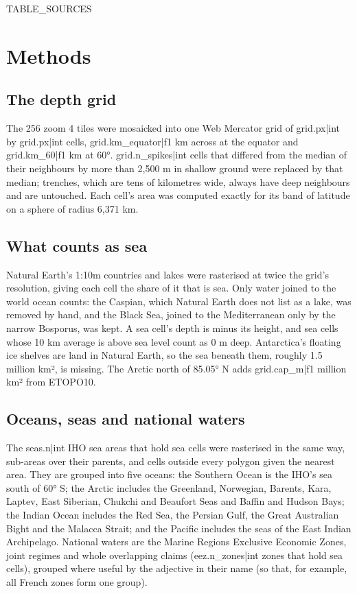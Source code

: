 \documentclass[11pt,a4paper]{article}
\begin{document}
{{TABLE_SOURCES}}

\section{Methods}
\subsection{The depth grid}
The 256 zoom 4 tiles were mosaicked into one Web Mercator grid of {{grid.px|int}} by {{grid.px|int}} cells, {{grid.km_equator|f1}} km across at the equator and {{grid.km_60|f1}} km at 60°. {{grid.n_spikes|int}} cells that differed from the median of their neighbours by more than 2,500 m in shallow ground were replaced by that median; trenches, which are tens of kilometres wide, always have deep neighbours and are untouched. Each cell's area was computed exactly for its band of latitude on a sphere of radius 6,371 km.

\subsection{What counts as sea}
Natural Earth's 1:10m countries and lakes were rasterised at twice the grid's resolution, giving each cell the share of it that is sea. Only water joined to the world ocean counts: the Caspian, which Natural Earth does not list as a lake, was removed by hand, and the Black Sea, joined to the Mediterranean only by the narrow Bosporus, was kept. A sea cell's depth is minus its height, and sea cells whose 10 km average is above sea level count as 0 m deep. Antarctica's floating ice shelves are land in Natural Earth, so the sea beneath them, roughly 1.5 million km², is missing. The Arctic north of 85.05° N adds {{grid.cap_m|f1}} million km² from ETOPO10.

\subsection{Oceans, seas and national waters}
The {{seas.n|int}} IHO sea areas that hold sea cells were rasterised in the same way, sub-areas over their parents, and cells outside every polygon given the nearest area. They are grouped into five oceans: the Southern Ocean is the IHO's sea south of 60° S; the Arctic includes the Greenland, Norwegian, Barents, Kara, Laptev, East Siberian, Chukchi and Beaufort Seas and Baffin and Hudson Bays; the Indian Ocean includes the Red Sea, the Persian Gulf, the Great Australian Bight and the Malacca Strait; and the Pacific includes the seas of the East Indian Archipelago. National waters are the Marine Regions Exclusive Economic Zones, joint regimes and whole overlapping claims ({{eez.n_zones|int}} zones that hold sea cells), grouped where useful by the adjective in their name (so that, for example, all French zones form one group).
\end{document}
